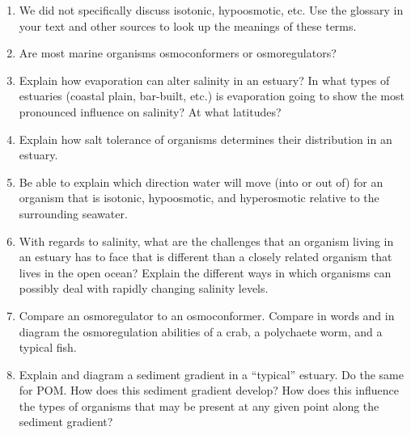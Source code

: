 \documentclass[nofonts, letterpaper]{tufte-handout}
\begin{document}
\begin{enumerate}
	\item We did not specifically discuss isotonic, hypoosmotic, etc.  Use the glossary in your text and other sources to look up the meanings of these terms.

	\item Are most marine organisms osmoconformers or osmoregulators?  

	\item Explain how evaporation can alter salinity in an estuary?  In what types of estuaries (coastal plain, bar-built, etc.) is evaporation going to show the most pronounced influence on salinity?  At what latitudes?

	\item Explain how salt tolerance of organisms determines their distribution in an estuary. 

	\item Be able to explain which direction water will move (into or out of) for an organism that is isotonic, hypoosmotic, and hyperosmotic relative to the surrounding seawater.

	\item With regards to salinity, what are the challenges that an organism living in an estuary has to face that is different than a closely related organism that lives in the open ocean?  Explain the different ways in which organisms can possibly deal with rapidly changing salinity levels.

	\item Compare an osmoregulator to an osmoconformer.  Compare in words and in diagram the osmoregulation abilities of a crab, a polychaete worm, and a typical fish.

	\item Explain and diagram a sediment gradient in a ``typical'' estuary.  Do the same for POM. How does this sediment gradient develop?  How does this influence the types of organisms that may be present at any given point along the sediment gradient?


\end{enumerate}
\end{document}
